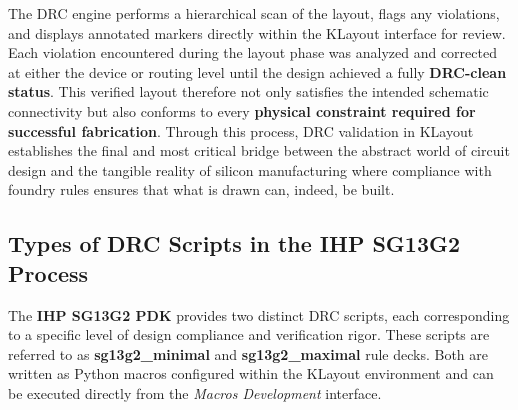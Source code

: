 \documentclass[
  11pt,
  a4paper,
  oneside]{scrbook}
\begin{document}
The DRC engine performs a hierarchical scan of the layout, flags any
violations, and displays annotated markers directly within the KLayout
interface for review. Each violation encountered during the layout phase
was analyzed and corrected at either the device or routing level until
the design achieved a fully \textbf{DRC-clean status}. This verified
layout therefore not only satisfies the intended schematic connectivity
but also conforms to every \textbf{physical constraint required for
successful fabrication}. Through this process, DRC validation in KLayout
establishes the final and most critical bridge between the abstract
world of circuit design and the tangible reality of silicon
manufacturing where compliance with foundry rules ensures that what is
drawn can, indeed, be built.

\subsection{Types of DRC Scripts in the IHP SG13G2
Process}\label{types-of-drc-scripts-in-the-ihp-sg13g2-process}

The \textbf{IHP SG13G2 PDK} provides two distinct DRC scripts, each
corresponding to a specific level of design compliance and verification
rigor. These scripts are referred to as \textbf{sg13g2\_minimal} and
\textbf{sg13g2\_maximal} rule decks. Both are written as Python macros
configured within the KLayout environment and can be executed directly
from the \emph{Macros Development} interface.
\end{document}
